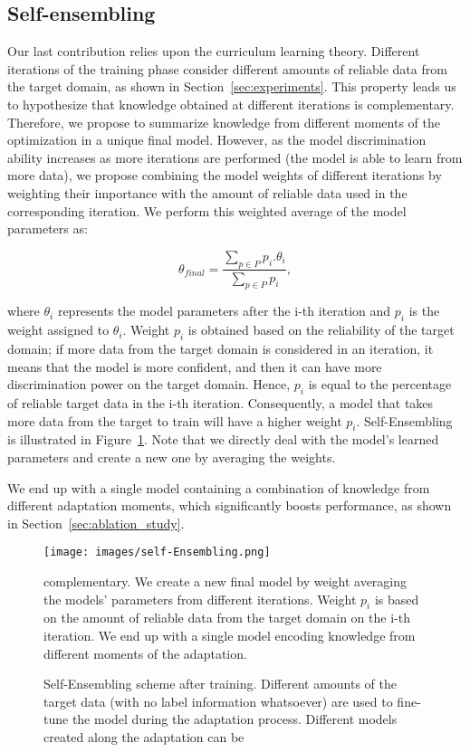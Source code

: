 \documentclass[journal]{IEEEtran}
\begin{document}
\subsection{Self-ensembling}
\label{sec:network_fusion}
 Our last contribution relies upon the curriculum learning theory. Different iterations of the training phase consider different amounts of reliable data from the target domain, as shown in Section~\ref{sec:experiments}. This property leads us to hypothesize that knowledge obtained at different iterations is complementary. Therefore, we propose to summarize knowledge from different moments of the optimization in a unique final model. However, as the model discrimination ability increases as more iterations are performed (the model is able to learn from more data), we propose combining the model weights of different iterations by weighting their importance with the amount of reliable data used in the corresponding iteration. We perform this weighted average of the model parameters as:

\begin{equation}
\label{eq:weight_average}
    \theta_{final} = \frac{\sum\limits_{p \in P} p_{i}.\theta_{i}}{\sum\limits_{p \in P} p_{i}},
\end{equation}

\noindent where $ \theta_{i} $ represents the model parameters after the i-th iteration and $p_{i} $ is the weight assigned to $ \theta_{i} $. Weight $ p_{i} $ is obtained based on the reliability of the target domain; if more data from the target domain is considered in an iteration, it means that the model is more confident, and then it can have more discrimination power on the target domain. Hence, $p_{i}$ is equal to the percentage of reliable target data in the i-th iteration. Consequently, a model that takes more data from the target to train will have a higher weight $ p_{i} $. Self-Ensembling is illustrated in Figure~\ref{fig:network_surgery}. Note that we directly deal with the model's learned parameters and create a new one by averaging the weights.

We end up with a single model containing a combination of knowledge from different adaptation moments, which significantly boosts performance, as shown in Section~\ref{sec:ablation_study}.

\begin{figure}[ht]
\centering
\texttt{[image: images/self-Ensembling.png]}
\caption{Self-Ensembling scheme after training. Different amounts of the target data (with no label information whatsoever) are used to fine-tune the model during the adaptation process. Different models created along the adaptation can be} complementary. We create a new final model by weight averaging the models' parameters from different iterations. Weight $p_{i}$ is based on the amount of reliable data from the target domain on the i-th iteration. We end up with a single model encoding knowledge from different moments of the adaptation.
\label{fig:network_surgery}
\end{figure}
\end{document}
